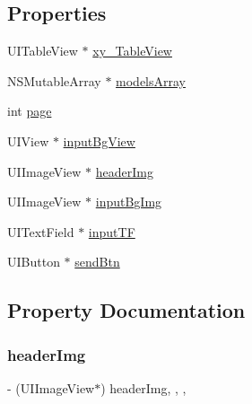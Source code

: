 \subsection*{Properties}
\begin{DoxyCompactItemize}
\item 
U\+I\+Table\+View $\ast$ \mbox{\hyperlink{category_comment_view_controller_07_08_a2c0be0c411c0861de3726c5b04616f23}{xy\+\_\+\+Table\+View}}
\item 
N\+S\+Mutable\+Array $\ast$ \mbox{\hyperlink{category_comment_view_controller_07_08_a4e15180016bb40aca1d93fd579187f20}{models\+Array}}
\item 
int \mbox{\hyperlink{category_comment_view_controller_07_08_a66bac9d4085126423085097e900dd987}{page}}
\item 
U\+I\+View $\ast$ \mbox{\hyperlink{category_comment_view_controller_07_08_a31e4ac3f936a6a1f0104adaf5993b3b3}{input\+Bg\+View}}
\item 
U\+I\+Image\+View $\ast$ \mbox{\hyperlink{category_comment_view_controller_07_08_a27fb87b6feb7ed8fe144d0ec7f7a26db}{header\+Img}}
\item 
U\+I\+Image\+View $\ast$ \mbox{\hyperlink{category_comment_view_controller_07_08_a51c4fc16bd5b901a50efa484676c9bef}{input\+Bg\+Img}}
\item 
U\+I\+Text\+Field $\ast$ \mbox{\hyperlink{category_comment_view_controller_07_08_af87223a4a6d3b4644b4e8e3de4b367e7}{input\+TF}}
\item 
U\+I\+Button $\ast$ \mbox{\hyperlink{category_comment_view_controller_07_08_a8f96b47f8e90953f610406fc17903aac}{send\+Btn}}
\end{DoxyCompactItemize}


\subsection{Property Documentation}
\mbox{\label{category_comment_view_controller_07_08_a27fb87b6feb7ed8fe144d0ec7f7a26db}} 
\subsubsection{\texorpdfstring{header\+Img}{headerImg}}
{\footnotesize\ttfamily -\/ (U\+I\+Image\+View$\ast$) header\+Img\hspace{0.3cm}{\ttfamily [read]}, {\ttfamily [write]}, {\ttfamily [nonatomic]}, {\ttfamily [strong]}}

